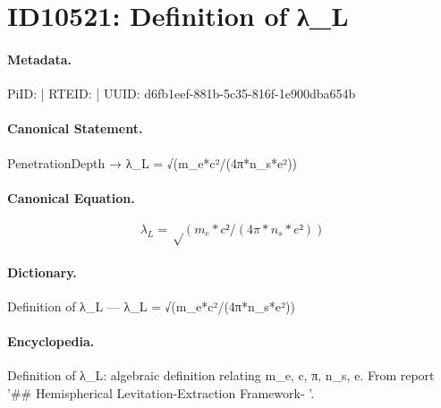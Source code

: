 \section*{ID10521: Definition of λ\_L}
\paragraph{Metadata.}
PiID:  | RTEID:  | UUID: d6fb1eef-881b-5c35-816f-1e900dba654b

\paragraph{Canonical Statement.}
PenetrationDepth → λ\_L = √(m\_e*c²/(4π*n\_s*e²))

\paragraph{Canonical Equation.}
\[
λ_L = √(m_e*c²/(4π*n_s*e²))
\]

\paragraph{Dictionary.}
Definition of λ\_L — λ\_L = √(m\_e*c²/(4π*n\_s*e²))

\paragraph{Encyclopedia.}
Definition of λ\_L: algebraic definition relating m\_e, c, π, n\_s, e. From report '\#\# Hemispherical Levitation-Extraction Framework- '.
